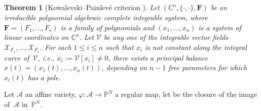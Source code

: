 \documentclass[pdftex]{sigma}
\numberwithin{equation}{section}
\newtheorem{Theorem}{Theorem}[section]
\begin{document}
\begin{Theorem}[Kowalevski--Painlev\'e criterion {\cite{al_Moer3}}]
Let $ (\mathbb{C}^n,\{\cdot,\cdot\}, \mathbf{F} )$ be an
irreducible polynomial algebraic complete integrable system, where
$\mathbf{F}= (F_1,\dots,F_s )$ is a family of polynomials
and $ (x_1,\dots,x_n )$ is a system of linear
coordinates on $\mathbb{C}^n$. Let $\mathcal{V}$ be any one of
the integrable vector fields
$\mathcal{X}_{F_1},\dots,\mathcal{X}_{F_s}$. For each $1\leq i
\leq n$ such that $x_i$ is not constant along the integral curve
of~$\mathcal{V}$, i.e., $\dot{x}_i:=\mathcal{V}[x_i]\neq 0$,
there exists a principal balance
$x (t )= (x_1 (t ), \dots,
x_n (t ) )$, depending on $n-1$ free parameters
for which $x_i (t )$ has a pole.
\end{Theorem}
Let $\mathcal{A}$ an affine variety,
$\varphi\colon \mathcal{A}\longrightarrow \mathbb{P}^N$ a regular map,
 let  be the closure of the
image of~$\mathcal{A}$ in~$\mathbb{P}^N$.
\end{document}
